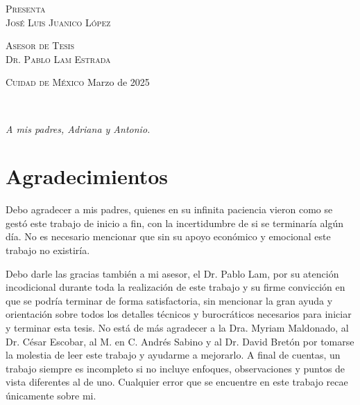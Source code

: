 \vspace{5pt}

\begin{center}
    \begin{minipage}{0.7\textwidth}
        \centering
        {\normalsize\textsc{Presenta}} \\
        {\Large\textsc{José Luis Juanico López}}
        \medskip
    \end{minipage}
\end{center}

\hspace{10pt}

\begin{center}
    \begin{minipage}{0.7\textwidth}
        \centering
        {\normalsize\textsc{Asesor de Tesis}} \\
        {\normalsize\textsc{Dr. Pablo Lam Estrada}}
        \medskip
    \end{minipage}
\end{center}

\vfill

\begin{center}
    \begin{minipage}{0.8\textwidth}
        {\normalsize\textsc{Cuidad de México} \hfill {\small Marzo de 2025}}
    \end{minipage}
\end{center}

\newpage
\thispagestyle{empty}
\

\newpage
{}
\thispagestyle{empty}
\hfill\textit{A mis padres, Adriana y Antonio.}
\newpage
\thispagestyle{empty}
\

\newpage
{}
\thispagestyle{plain}
\section*{Agradecimientos}

Debo agradecer a mis padres, quienes en su infinita paciencia vieron como se gestó este trabajo de inicio a fin, con la incertidumbre de si se terminaría algún día. No es necesario mencionar que sin su apoyo económico y emocional este trabajo no existiría.
\bigskip

Debo darle las gracias también a mi asesor, el Dr. Pablo Lam, por su atención incodicional durante toda la realización de este trabajo y su firme convicción en que se podría terminar de forma satisfactoria, sin mencionar la gran ayuda y orientación sobre todos los detalles técnicos y burocráticos necesarios para iniciar y terminar esta tesis. No está de más agradecer a la Dra. Myriam Maldonado, al Dr. César Escobar, al M. en C. Andrés Sabino y al Dr. David Bretón por tomarse la molestia de leer este trabajo y ayudarme a mejorarlo. A final de cuentas, un trabajo siempre es incompleto si no incluye enfoques, observaciones y puntos de vista diferentes al de uno. Cualquier error que se encuentre en este trabajo recae únicamente sobre mi.
\bigskip


